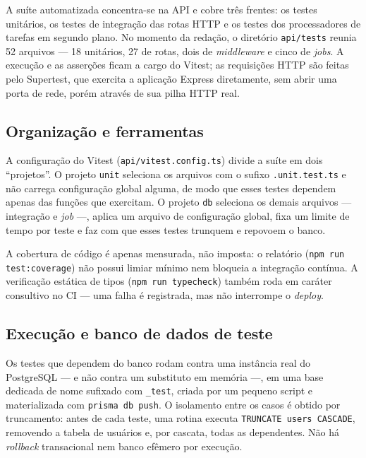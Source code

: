 A suíte automatizada concentra-se na API e cobre três frentes: os testes
unitários, os testes de integração das rotas HTTP e os testes dos processadores
de tarefas em segundo plano. No momento da redação, o diretório
\texttt{api/tests} reunia 52 arquivos --- 18 unitários, 27 de rotas, dois de
\textit{middleware} e cinco de \textit{jobs}. A execução e as asserções ficam a
cargo do Vitest; as requisições HTTP são feitas pelo Supertest, que exercita a
aplicação Express diretamente, sem abrir uma porta de rede, porém através de
sua pilha HTTP real.

\subsection{Organização e ferramentas}\label{sec:test-api-org}

A configuração do Vitest (\texttt{api/vitest.config.ts}) divide a suíte em dois
``projetos''. O projeto \texttt{unit} seleciona os arquivos com o sufixo
\texttt{.unit.test.ts} e não carrega configuração global alguma, de modo que
esses testes dependem apenas das funções que exercitam. O projeto \texttt{db}
seleciona os demais arquivos --- integração e \textit{job} ---, aplica um arquivo
de configuração global, fixa um limite de tempo por teste e faz com que esses
testes trunquem e repovoem o banco.

A cobertura de código é apenas mensurada, não imposta: o relatório
(\texttt{npm run test:coverage}) não possui limiar mínimo nem bloqueia a
integração contínua. A verificação estática de tipos (\texttt{npm run typecheck})
também roda em caráter consultivo no CI --- uma falha é registrada, mas não
interrompe o \textit{deploy}.

\subsection{Execução e banco de dados de teste}\label{sec:test-api-db}

Os testes que dependem do banco rodam contra uma instância real do PostgreSQL
--- e não contra um substituto em memória ---, em uma base dedicada de nome
sufixado com \texttt{\_test}, criada por um pequeno script e materializada com
\texttt{prisma db push}. O isolamento entre os casos é obtido por truncamento:
antes de cada teste, uma rotina executa \texttt{TRUNCATE users CASCADE},
removendo a tabela de usuários e, por cascata, todas as dependentes. Não há
\textit{rollback} transacional nem banco efêmero por execução.

